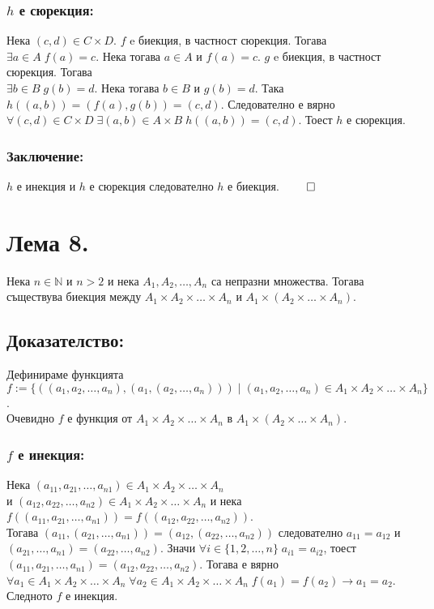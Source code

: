 \documentclass[a4paper, 12pt, oneside]{article}
\newcommand{\N}{\mathbb{N}}
\begin{document}
\subsubsection*{\(h\) е сюрекция:}
Нека \((c, d) \in C \times D\). \(f\) e биекция, в частност сюрекция.
Тогава \(\exists a \in A \; f(a) = c\). Нека тогава \(a \in A\) и \(f(a) = c\).
\(g\) e биекция, в частност сюрекция. Тогава \\
\(\exists b \in B \; g(b) = d\). Нека тогава \(b \in B\) и \(g(b) = d\).
Така \(h((a, b)) = (f(a), g(b)) = (c, d)\).
Следователно е вярно \(\forall (c, d) \in C \times D \; \exists (a, b) \in A \times B \; h((a, b)) = (c, d)\).
Тоест \(h\) е сюрекция.
\subsubsection*{Заключение:}
\(h\) е инекция и \(h\) е сюрекция следователно \(h\) е биекция. \(\qed\)
\section*{Лема 8.}
Нека \(n \in \N\) и \(n > 2\) и нека 
\(A_1, A_2, \dots, A_n\) са непразни множества.
Тогава съществува биекция между \(A_1 \times A_2 \times \dots \times A_n\)
и \(A_1 \times (A_2 \times \dots \times A_n)\).
\subsection*{Доказателство:}
Дефинираме функцията \\
\(f := \{((a_1, a_2, \dots, a_n), (a_1, (a_2, \dots, a_n))) \; | \; (a_1, a_2, \dots, a_n) \in A_1 \times A_2 \times \dots \times A_n\}\). \\
Очевидно \(f\) е функция от \(A_1 \times A_2 \times \dots \times A_n\) в \(A_1 \times (A_2 \times \dots \times A_n)\).
\subsubsection*{\(f\) е инекция:}
Нека \((a_{11}, a_{21}, \dots, a_{n1}) \in A_1 \times A_2 \times \dots \times A_n\) \\
и \((a_{12}, a_{22}, \dots, a_{n2}) \in A_1 \times A_2 \times \dots \times A_n\)
и нека \(f((a_{11}, a_{21}, \dots, a_{n1})) = f((a_{12}, a_{22}, \dots, a_{n2}))\). \\
Тогава \((a_{11}, (a_{21}, \dots, a_{n1})) = (a_{12}, (a_{22}, \dots, a_{n2}))\)
следователно \(a_{11} = a_{12}\) и \((a_{21}, \dots, a_{n1}) = (a_{22}, \dots, a_{n2})\).
Значи \(\forall i \in \{1, 2, \dots, n\} \; a_{i1} = a_{i2}\),
тоест \((a_{11}, a_{21}, \dots, a_{n1}) = (a_{12}, a_{22}, \dots, a_{n2})\).
Тогава е вярно \\
\(\forall a_1 \in A_1 \times A_2 \times \dots \times A_n \; \forall a_2 \in A_1 \times A_2 \times \dots \times A_n \; f(a_1) = f(a_2) \longrightarrow a_1 = a_2\).
Следното \(f\) е инекция.
\end{document}
